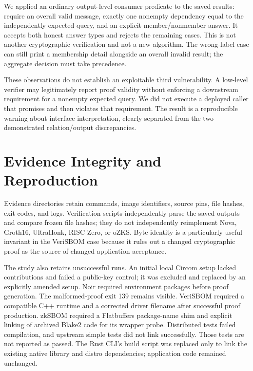 \documentclass[sigconf,nonacm]{acmart}
\begin{document}

We applied an ordinary output-level consumer predicate to the saved results: require an overall valid message, exactly one nonempty dependency equal to the independently expected query, and an explicit member/nonmember answer. It accepts both honest answer types and rejects the remaining cases. This is not another cryptographic verification and not a new algorithm. The wrong-label case can still print a membership detail alongside an overall invalid result; the aggregate decision must take precedence.

These observations do not establish an exploitable third vulnerability. A low-level verifier may legitimately report proof validity without enforcing a downstream requirement for a nonempty expected query. We did not execute a deployed caller that promises and then violates that requirement. The result is a reproducible warning about interface interpretation, clearly separated from the two demonstrated relation/output discrepancies.

\section{Evidence Integrity and Reproduction}
Evidence directories retain commands, image identifiers, source pins, file hashes, exit codes, and logs. Verification scripts independently parse the saved outputs and compare frozen file hashes; they do not independently reimplement Nova, Groth16, UltraHonk, RISC Zero, or oZKS. Byte identity is a particularly useful invariant in the VeriSBOM case because it rules out a changed cryptographic proof as the source of changed application acceptance.

The study also retains unsuccessful runs. An initial local Circom setup lacked contributions and failed a public-key control; it was excluded and replaced by an explicitly amended setup. Noir required environment packages before proof generation. The malformed-proof exit 139 remains visible. VeriSBOM required a compatible C++ runtime and a corrected driver filename after successful proof production. zkSBOM required a Flatbuffers package-name shim and explicit linking of archived Blake2 code for its wrapper probe. Distributed tests failed compilation, and upstream simple tests did not link successfully. Those tests are not reported as passed. The Rust CLI's build script was replaced only to link the existing native library and distro dependencies; application code remained unchanged.
\end{document}
